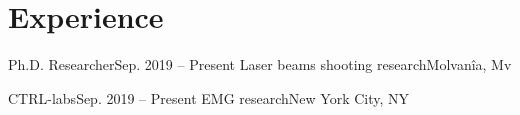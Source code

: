 
\section{Experience}

\resumeSubHeadingListStart
  
  \resumeSubheading
  {Ph.D. Researcher}{Sep. 2019 -- Present}
  {Laser beams shooting research}{Molvanîa, Mv}
  \resumeItemListStart
  \resumeItemListEnd

  \resumeSubheading
  {CTRL-labs}{Sep. 2019 -- Present}
  {EMG research}{New York City, NY}
  \resumeItemListStart
  \resumeItemListEnd

\resumeSubHeadingListEnd